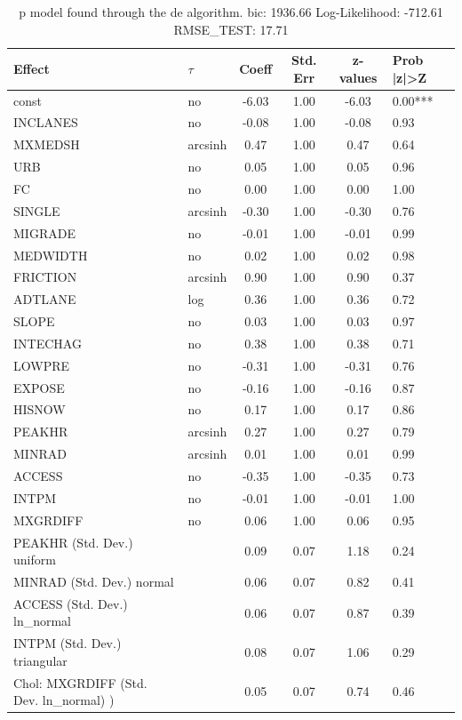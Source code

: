 \begin{table}
	\caption{p model found through the de algorithm. bic: 1936.66 Log-Likelihood: -712.61 RMSE_TEST: 17.71}
	\begin{center}
		\begin{tabular}{|l|l|c|c|c|l|}
			\hline
			Effect & $\tau$ & Coeff & Std. Err & z-values & Prob |z|>Z \\
			\hline
			const & no & -6.03 & 1.00 & -6.03 & 0.00*** \\
			\hline
			INCLANES & no & -0.08 & 1.00 & -0.08 & 0.93 \\
			\hline
			MXMEDSH & arcsinh & 0.47 & 1.00 & 0.47 & 0.64 \\
			\hline
			URB & no & 0.05 & 1.00 & 0.05 & 0.96 \\
			\hline
			FC & no & 0.00 & 1.00 & 0.00 & 1.00 \\
			\hline
			SINGLE & arcsinh & -0.30 & 1.00 & -0.30 & 0.76 \\
			\hline
			MIGRADE & no & -0.01 & 1.00 & -0.01 & 0.99 \\
			\hline
			MEDWIDTH & no & 0.02 & 1.00 & 0.02 & 0.98 \\
			\hline
			FRICTION & arcsinh & 0.90 & 1.00 & 0.90 & 0.37 \\
			\hline
			ADTLANE & log & 0.36 & 1.00 & 0.36 & 0.72 \\
			\hline
			SLOPE & no & 0.03 & 1.00 & 0.03 & 0.97 \\
			\hline
			INTECHAG & no & 0.38 & 1.00 & 0.38 & 0.71 \\
			\hline
			LOWPRE & no & -0.31 & 1.00 & -0.31 & 0.76 \\
			\hline
			EXPOSE & no & -0.16 & 1.00 & -0.16 & 0.87 \\
			\hline
			HISNOW & no & 0.17 & 1.00 & 0.17 & 0.86 \\
			\hline
			PEAKHR & arcsinh & 0.27 & 1.00 & 0.27 & 0.79 \\
			\hline
			MINRAD & arcsinh & 0.01 & 1.00 & 0.01 & 0.99 \\
			\hline
			ACCESS & no & -0.35 & 1.00 & -0.35 & 0.73 \\
			\hline
			INTPM & no & -0.01 & 1.00 & -0.01 & 1.00 \\
			\hline
			MXGRDIFF & no & 0.06 & 1.00 & 0.06 & 0.95 \\
			\hline
			PEAKHR (Std. Dev.) uniform &  & 0.09 & 0.07 & 1.18 & 0.24 \\
			\hline
			MINRAD (Std. Dev.) normal &  & 0.06 & 0.07 & 0.82 & 0.41 \\
			\hline
			ACCESS (Std. Dev.) ln_normal &  & 0.06 & 0.07 & 0.87 & 0.39 \\
			\hline
			INTPM (Std. Dev.) triangular &  & 0.08 & 0.07 & 1.06 & 0.29 \\
			\hline
			 Chol: MXGRDIFF (Std. Dev. ln_normal) ) &  & 0.05 & 0.07 & 0.74 & 0.46 \\
			\hline
		\end{tabular}
	\end{center}
\end{table}